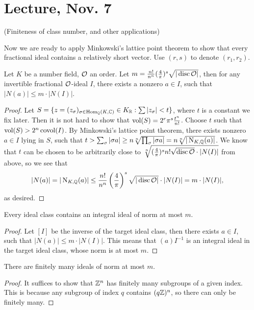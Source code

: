 \documentclass[11pt]{amsart}
\begin{document}
\section{Lecture, Nov. 7}


(Finiteness of class number, and other applications)

Now we are ready to apply Minkowski's lattice point theorem to show that every fractional ideal contains a relatively short vector. Use $(r,s)$ to denote $(r_1,r_2)$.


\begin{thm}
Let $K$ be a number field, $\mathcal{O}$ an order. Let $m = \frac{n!}{n^n} (\frac{4}{\pi})^{s} \sqrt{|\operatorname{disc} \mathcal{O}|}$, then for any invertible fractional $\mathcal{O}$-ideal $I$, there exists a nonzero $a\in I$, such that $|N(a)|\le m\cdot |N(I)|$.
\end{thm}

\begin{proof}
Let $S = \{z = (z_{\sigma})_{\sigma\in \operatorname{Hom}_{\mathbb{Q}}(K,\mathbb{C})} \in K_{\mathbb{R}}: \sum |z_{\sigma}| < t\}$, where $t$ is a constant we fix later. Then it is not hard to show that $\operatorname{vol}(S) = 2^r \pi^s \frac{t^n}{n!}$. Choose $t$ such that $\operatorname{vol}(S) > 2^n\operatorname{covol}(I)$. By Minkowski's lattice point theorem, there exists nonzero $a\in I$ lying in $S$, such that $t > \sum_{\sigma} |\sigma a|\ge n\sqrt[n]{\prod_{\sigma} |\sigma a|} = n\sqrt[n]{|\operatorname{N}_{K,\mathbb{Q}}(a)|}$. We know that $t$ can be chosen to be arbitrarily close to $\sqrt[n]{(\frac{4}{\pi})^s n! \sqrt{\operatorname{disc} \mathcal{O}} \cdot |N(I)|}$ from above, so we see that
\[|N(a)| = |\operatorname{N}_{K,\mathbb{Q}}(a)| \le \frac{n!}{n^n} \left( \frac{4}{\pi} \right)^{s} \sqrt{|\operatorname{disc} \mathcal{O}|} \cdot |N(I)| = m\cdot |N(I)|,\]
as desired.
\end{proof}

\begin{cor}
Every ideal class contains an integral ideal of norm at most $m$.
\end{cor}

\begin{proof}
Let $[I]$ be the inverse of the target ideal class, then there exists $a\in I$, such that $|N(a)|\le m\cdot |N(I)|$. This means that $(a)I^{-1}$ is an integral ideal in the target ideal class, whose norm is at most $m$.
\end{proof}

\begin{lem}
There are finitely many ideals of norm at most $m$.
\end{lem}

\begin{proof}
It suffices to show that $\mathbb{Z}^n$ has finitely many subgroups of a given index. This is because any subgroup of index $q$ contains $(q\mathbb{Z})^n$, so there can only be finitely many.
\end{proof}
\end{document}
